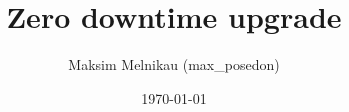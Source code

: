 \documentclass{beamer}
\begin{document}
\title{Zero downtime upgrade}
\author{Maksim Melnikau (max\_posedon)}
\date{\today}
\frame{\titlepage}
\end{document}
